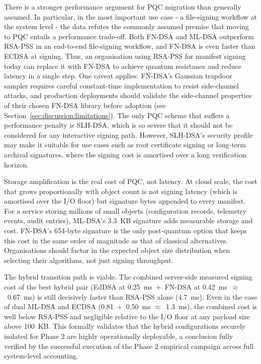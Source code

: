 \documentclass[12pt,a4paper]{article}
\begin{document}
There is a stronger performance argument for PQC migration than generally assumed. In particular, in the most important use case - a file-signing workflow at the system level - the data refutes the commonly assumed premise that moving to PQC entails a performance trade-off. Both FN-DSA and ML-DSA outperform RSA-PSS in an end-to-end file-signing workflow, and FN-DSA is even faster than ECDSA at signing. Thus, an organisation using RSA-PSS for manifest signing today can replace it with FN-DSA to achieve quantum resistance and reduce latency in a single step. One caveat applies: FN-DSA's Gaussian trapdoor sampler requires careful constant-time implementation to resist side-channel attacks, and production deployments should validate the side-channel properties of their chosen FN-DSA library before adoption (see Section~\ref{sec:discussion:limitations}). The only PQC scheme that suffers a performance penalty is SLH-DSA, which is so severe that it should not be considered for any interactive signing path. However, SLH-DSA's security profile may make it suitable for use cases such as root certificate signing or long-term archival signatures, where the signing cost is amortised over a long verification horizon.

Storage amplification is the real cost of PQC, not latency. At cloud scale, the cost that grows proportionally with object count is not signing latency (which is amortised over the I/O floor) but signature bytes appended to every manifest. For a service storing millions of small objects (configuration records, telemetry events, audit entries), ML-DSA's 3.3~KB signature adds measurable storage and cost. FN-DSA's 654-byte signature is the only post-quantum option that keeps this cost in the same order of magnitude as that of classical alternatives. Organisations should factor in the expected object size distribution when selecting their algorithms, not just signing throughput.

The hybrid transition path is viable. The combined server-side measured signing cost of the best hybrid pair (EdDSA at 0.25~ms~+~FN-DSA at 0.42~ms~$\approx$~0.67~ms) is still decisively faster than RSA-PSS alone (4.7~ms). Even in the case of dual ML-DSA and ECDSA (0.81~+~0.50~ms $\approx$~1.3~ms), the combined cost is well below RSA-PSS and negligible relative to the I/O floor at any payload size above 100~KB. This formally validates that the hybrid configurations securely isolated for Phase 2 are highly operationally deployable, a conclusion fully verified by the successful execution of the Phase 2 empirical campaign across full system-level accounting.
\end{document}
